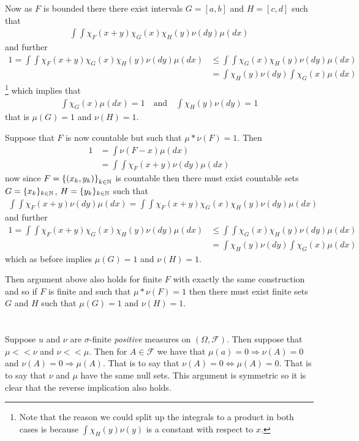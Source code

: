 \documentclass{unswmaths}
\begin{document}
Now as $ F $ is bounded there there exist intervals $ G = [a,b] $ and $ H = [c,d]$ such that
\begin{align}
	\int\int \chi_F(x+y) \chi_G(x) \chi_H(y) \nu(dy) \mu(dx)
\end{align}
and further
\begin{align}
	1=\int\int \chi_F(x+y) \chi_G(x) \chi_H(y) \nu(dy)\mu(dx) & \leq \int\int  \chi_G(x) \chi_H(y) \nu(dy) \mu(dx) \\
	&= \int \chi_{H}(y) \nu(dy) \int  \chi_G(x) \mu(dx)
\end{align}
\footnote{Note that the reason we could split up the integrals to a product in both cases is because $ \int \chi_H(y) \nu(y) $ is a constant with respect to $ x $.}
which implies that
\begin{align}
\int  \chi_G(x) \mu(dx) = 1 \ \ \ \text{ and } \ \ \ \int \chi_{H}(y) \nu(dy) = 1
\end{align}
that is $ \mu(G) = 1 $ and $ \nu(H) = 1 $.


Suppose that $ F $ is now countable but such that $ \mu * \nu (F) = 1 $.
Then
\begin{align}
	1 &= \int \nu(F - x) \mu(dx) \\
		&= \int \int \chi_{F}(x+y) \nu(dy) \mu(dx)
\end{align}
now since $ F = \left\{(x_k, y_k) \right\}_{k \in \mathbb{N}}$ is countable then there must exist countable sets $ G = \{ x_k \}_{k\in\mathbb{N}} $, $ H = \{ y_k \}_{k\in\mathbb{N}} $
such that
\begin{align}
	\int\int \chi_F(x+y) \nu(dy)\mu(dx) = \int\int \chi_F(x+y) \chi_G(x) \chi_H(y) \nu(dy)\mu(dx)
\end{align}
and further
\begin{align}
	1 = \int\int \chi_F(x+y) \chi_G(x) \chi_H(y) \nu(dy)\mu(dx) &\leq \int\int \chi_G(x) \chi_H(y) \nu(dy)\mu(dx) \\
	&= \int \chi_H(y) \nu(dy) \int \chi_G(x)\mu(dx)
\end{align}
which as before implies $ \mu(G) = 1 $ and $ \nu(H) = 1 $.

Then argument above also holds for finite $ F $ with exactly the same construction and so if $ F $ is finite and such that $ \mu * \nu(F) = 1 $ then there must exist finite sets $ G $ and $ H $ such that $ \mu(G) = 1 $ and $ \nu(H) = 1 $.
\section{}
\subsection{}
Suppose $ u $ and $ \nu $ are $\sigma$-finite \emph{positive} measures on $ (\Omega, \mathcal{F}) $. Then suppose that $ \mu << \nu $ and $ \nu << \mu $.
Then for $ A \in \mathcal{F} $ we have that $ \mu(a) = 0 \Rightarrow \nu(A) = 0 $ and $ \nu(A) = 0 \Rightarrow \mu(A) $. That is to say that $ \nu(A) =0 \Leftrightarrow \mu(A) = 0 $. That is to say that $ \nu $ and $ \mu $ have the same null sets. This argument is symmetric so it is clear that the reverse implication also holds.
\end{document}
